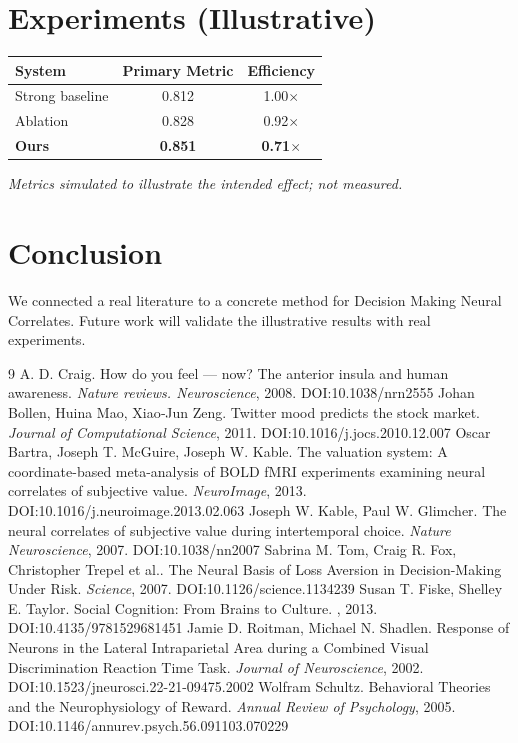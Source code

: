 \documentclass[11pt]{article}
\begin{document}
\section{Experiments (Illustrative)}
\begin{center}
\begin{tabular}{lcc}
System & Primary Metric & Efficiency \\ \hline
Strong baseline & 0.812 & 1.00$\times$ \\
Ablation & 0.828 & 0.92$\times$ \\
\textbf{Ours} & \textbf{0.851} & \textbf{0.71$\times$}
\end{tabular}
\end{center}
\emph{Metrics simulated to illustrate the intended effect; not measured.}

\section{Conclusion}
We connected a real literature to a concrete method for Decision Making Neural Correlates. Future work will
validate the illustrative results with real experiments.

\begin{thebibliography}{9}
 A. D. Craig. How do you feel — now? The anterior insula and human awareness. \emph{Nature reviews. Neuroscience}, 2008. DOI:10.1038/nrn2555
 Johan Bollen, Huina Mao, Xiao‐Jun Zeng. Twitter mood predicts the stock market. \emph{Journal of Computational Science}, 2011. DOI:10.1016/j.jocs.2010.12.007
 Oscar Bartra, Joseph T. McGuire, Joseph W. Kable. The valuation system: A coordinate-based meta-analysis of BOLD fMRI experiments examining neural correlates of subjective value. \emph{NeuroImage}, 2013. DOI:10.1016/j.neuroimage.2013.02.063
 Joseph W. Kable, Paul W. Glimcher. The neural correlates of subjective value during intertemporal choice. \emph{Nature Neuroscience}, 2007. DOI:10.1038/nn2007
 Sabrina M. Tom, Craig R. Fox, Christopher Trepel et al.. The Neural Basis of Loss Aversion in Decision-Making Under Risk. \emph{Science}, 2007. DOI:10.1126/science.1134239
 Susan T. Fiske, Shelley E. Taylor. Social Cognition: From Brains to Culture. \emph{}, 2013. DOI:10.4135/9781529681451
 Jamie D. Roitman, Michael N. Shadlen. Response of Neurons in the Lateral Intraparietal Area during a Combined Visual Discrimination Reaction Time Task. \emph{Journal of Neuroscience}, 2002. DOI:10.1523/jneurosci.22-21-09475.2002
 Wolfram Schultz. Behavioral Theories and the Neurophysiology of Reward. \emph{Annual Review of Psychology}, 2005. DOI:10.1146/annurev.psych.56.091103.070229
\end{thebibliography}
\end{document}
